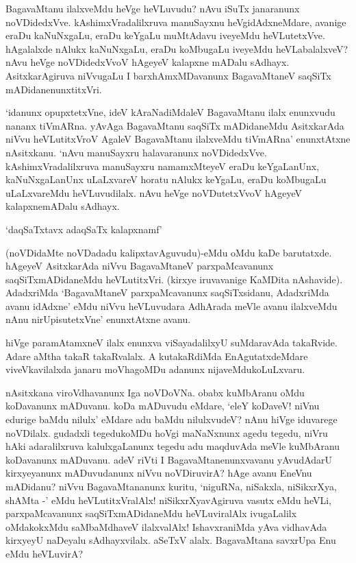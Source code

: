 BagavaMtanu ilalxveMdu heVge heVLuvudu? nAvu iSuTx janaranunx noVDidedxVve. kAshimxVradalilxruva manuSayxnu heVgidAdxneMdare, avanige eraDu kaNuNxgaLu, eraDu keYgaLu muMtAdavu iveyeMdu heVLutetxVve. hAgalalxde nAlukx kaNuNxgaLu, eraDu koMbugaLu iveyeMdu heVLabalalxveV? nAvu heVge noVDidedxVvoV hAgeyeV kalapxne mADalu sAdhayx. AsitxkarAgiruva niVvugaLu I barxhAmxMDavanunx BagavaMtaneV saqSiTx mADidanenunxtitxVri.

`idanunx opupxtetxVne, ideV kAraNadiMdaleV BagavaMtanu ilalx enunxvudu nananx tiVmARna. yAvAga BagavaMtanu saqSiTx mADidaneMdu AsitxkarAda niVvu heVLutitxVroV AgaleV BagavaMtanu ilalxveMdu tiVmARna' enunxtAtxne nAsitxkanu. `nAvu manuSayxru halavaranunx noVDidedxVve. kAshimxVradalilxruva manuSayxru namamxMteyeV eraDu keYgaLanUnx, kaNuNxgaLanUnx uLaLxvareV horatu nAlukx keYgaLu, eraDu koMbugaLu uLaLxvareMdu heVLuvudilalx. nAvu heVge noVDutetxVvoV hAgeyeV kalapxnemADalu sAdhayx.

\begin{shloka}
`daqSaTxtavx adaqSaTx kalapxnamf'
\end{shloka}

(noVDidaMte noVDadadu kalipxtavAguvudu)-eMdu oMdu kaDe barutatxde. hAgeyeV AsitxkarAda niVvu BagavaMtaneV parxpaMcavanunx saqSiTxmADidaneMdu heVLutitxVri. (kirxye iruvavanige KaMDita nAshavide). AdadxriMda `BagavaMtaneV parxpaMcavanunx saqSiTxsidanu, AdadxriMda avanu idAdxne' eMdu niVvu heVLuvudara AdhArada meVle avanu ilalxveMdu nAnu nirUpisutetxVne' enunxtAtxne avanu.

hiVge paramAtamxneV ilalx enunxva viSayadalilxyU suMdaravAda takaRvide. Adare aMtha takaR takaRvalalx. A kutakaRdiMda EnAgutatxdeMdare viveVkavilalxda janaru moVhagoMDu adanunx nijaveMdukoLuLxvaru.

nAsitxkana viroVdhavanunx Iga noVDoVNa. obabx kuMbAranu oMdu koDavanunx mADuvanu. koDa mADuvudu eMdare, `eleY koDaveV! niVnu edurige baMdu nilulx' eMdare adu baMdu nilulxvudeV? nAnu hiVge iduvarege noVDilalx. gudadxli tegedukoMDu hoVgi maNaNxnunx agedu tegedu, niVru hAki adaralilxruva kalulxgaLanunx tegedu adu maqduvAda meVle kuMbAranu koDavanunx mADuvanu. adeV riVti I BagavaMtanenunxvavanu yAvudAdarU kirxyeyanunx mADuvudanunx niVvu noVDiruvirA? hAge avanu EneVnu mADidanu? niVvu BagavaMtananunx kuritu, `niguRNa, niSakxla, niSikxrXya, shAMta -' eMdu heVLutitxVralAlx! niSikxrXyavAgiruva vasutx eMdu heVLi, parxpaMcavanunx saqSiTxmADidaneMdu heVLuviralAlx ivugaLalilx oMdakokxMdu saMbaMdhaveV ilalxvalAlx! IshavxraniMda yAva vidhavAda kirxyeyU naDeyalu sAdhayxvilalx. aSeTxV alalx. BagavaMtana savxrUpa Enu eMdu heVLuvirA?


